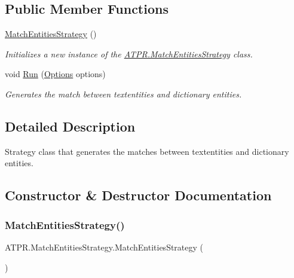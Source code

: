 \subsection*{Public Member Functions}
\begin{DoxyCompactItemize}
\item 
\hyperlink{class_a_t_p_r_1_1_match_entities_strategy_a21587dd85c37c7796b4cd4e48bc85459}{Match\+Entities\+Strategy} ()
\begin{DoxyCompactList}\small\item\em Initializes a new instance of the \hyperlink{class_a_t_p_r_1_1_match_entities_strategy}{A\+T\+P\+R.\+Match\+Entities\+Strategy} class. \end{DoxyCompactList}\item 
void \hyperlink{class_a_t_p_r_1_1_match_entities_strategy_a7494fa761f1e14c463b4c6e5614ae1c4}{Run} (\hyperlink{class_a_t_p_r_1_1_options}{Options} options)
\begin{DoxyCompactList}\small\item\em Generates the match between textentities and dictionary entities. \end{DoxyCompactList}\end{DoxyCompactItemize}


\subsection{Detailed Description}
Strategy class that generates the matches between textentities and dictionary entities. 



\subsection{Constructor \& Destructor Documentation}
\hypertarget{class_a_t_p_r_1_1_match_entities_strategy_a21587dd85c37c7796b4cd4e48bc85459}{}\label{class_a_t_p_r_1_1_match_entities_strategy_a21587dd85c37c7796b4cd4e48bc85459} 
\subsubsection{\texorpdfstring{Match\+Entities\+Strategy()}{MatchEntitiesStrategy()}}
{\footnotesize\ttfamily A\+T\+P\+R.\+Match\+Entities\+Strategy.\+Match\+Entities\+Strategy (\begin{DoxyParamCaption}{ }\end{DoxyParamCaption})\hspace{0.3cm}{\ttfamily [inline]}}



